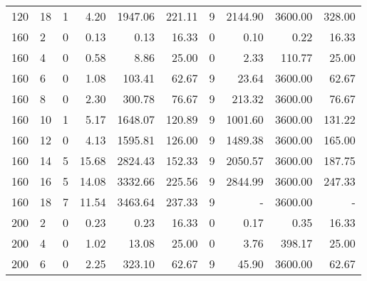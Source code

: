\begin{appendices}
\begin{table*}[h]
\begin{center}
\begin{tabular} {l l | r r r r | r r r r}
 120 & 18                                &  1           &  4.20         &  1947.06   &  221.11          &  9            &   2144.90    & 3600.00     &  328.00      \\ 
 160 & 2                                 &  0           &  0.13         &  0.13      &  16.33           &  0            &   0.10       & 0.22        &  16.33       \\ 
 160 & 4                                 &  0           &  0.58         &  8.86      &  25.00           &  0            &   2.33       & 110.77      &  25.00       \\ 
 160 & 6                                 &  0           &  1.08         &  103.41    &  62.67           &  9            &   23.64      & 3600.00     &  62.67       \\ 
 160 & 8                                 &  0           &  2.30         &  300.78    &  76.67           &  9            &   213.32     & 3600.00     &  76.67       \\ 
 160 & 10                                &  1           &  5.17         &  1648.07   &  120.89          &  9            &   1001.60    & 3600.00     &  131.22      \\ 
 160 & 12                                &  0           &  4.13         &  1595.81   &  126.00          &  9            &   1489.38    & 3600.00     &  165.00      \\ 
 160 & 14                                &  5           &  15.68        &  2824.43   &  152.33          &  9            &   2050.57    & 3600.00     &  187.75      \\ 
 160 & 16                                &  5           &  14.08        &  3332.66   &  225.56          &  9            &   2844.99    & 3600.00     &  247.33      \\ 
 160 & 18                                &  7           &  11.54        &  3463.64   &  237.33          &  9            &   -          & 3600.00     &  -           \\ 
 200 & 2                                 &  0           &  0.23         &  0.23      &  16.33           &  0            &   0.17       & 0.35        &  16.33       \\ 
 200 & 4                                 &  0           &  1.02         &  13.08     &  25.00           &  0            &   3.76       & 398.17      &  25.00       \\ 
 200 & 6                                 &  0           &  2.25         &  323.10    &  62.67           &  9            &   45.90      & 3600.00     &  62.67       \\ 

\end{tabular}
\end{center}
\end{table*}
\end{appendices}
